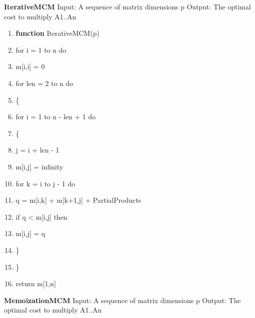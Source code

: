 \documentclass[conference]{IEEEtran}
\begin{document}
\textbf{IterativeMCM}
\newline
Input: A sequence of matrix dimensions p
Output: The optimal cost to multiply A1..An

\begingroup
\renewcommand\labelenumi{\theenumi:}
\begin{enumerate}
\item \textbf{function} IterativeMCM(p)  \label{item:1}
\item for i = 1 to n do \label{item:2}
\item m[i,i] = 0 \label{item:3}
\item for len = 2 to n do \label{item:4}
\item \{ \label{item:4}
\item for i = 1 to n - len + 1 do \label{item:4}
\item \{ \label{item:4}
\item j = i + len - 1 \label{item:4}
\item m[i,j] = infinity \label{item:4}
\item for k = i to j - 1 do\label{item:4}
\item q = m[i,k] + m[k+1,j] + PartialProducts \label{item:4}
\item if q < m[i,j] then \label{item:4}
\item m[i,j] = q \label{item:4}
\item \} \label{item:4}
\item \} \label{item:4}
\item return m[1,n] \label{item:4}
\end{enumerate}
\endgroup

\textbf{MemoizationMCM}
\newline
Input: A sequence of matrix dimensions p
Output: The optimal cost to multiply A1..An
\end{document}
